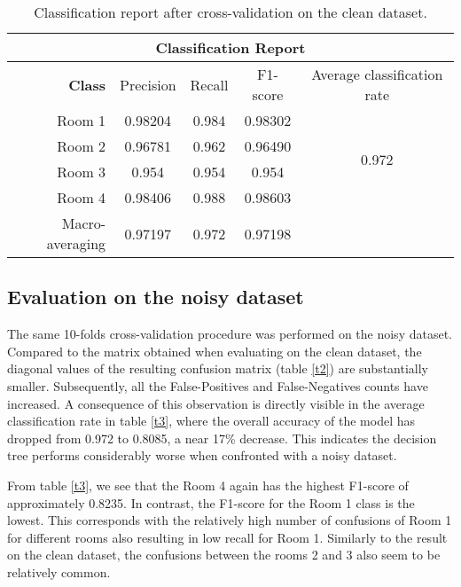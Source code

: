\documentclass[11pt, a4paper]{article}
\begin{document}
\begin{table}[H]
  \centering
  \setlength{\tabcolsep}{0.25cm}
  \renewcommand{\arraystretch}{1.25}
  \begin{tabular}{|r|c|c|c|c|}
  \hline
  \multicolumn{5}{|c|}{\textbf{Classification Report}}\\
  \hline
  \textbf{Class} & Precision & Recall & F1-score & Average classification rate \\
  \hline
  Room 1 & 0.98204 & 0.984 & 0.98302 & \multirow{4}{*}{0.972}\\ \cline{1-4}
  Room 2 & 0.96781 & 0.962 & 0.96490 &  \\ \cline{1-4}
  Room 3 & 0.954 & 0.954 & 0.954 &  \\ \cline{1-4}
  Room 4 & 0.98406 & 0.988 & 0.98603 &    \\ \cline{1-4}
  Macro-averaging & 0.97197 & 0.972 & 0.97198 &  \\ \hline
  \end{tabular}
  \caption{Classification report after cross-validation on the clean dataset.}
  \label{t1}
\end{table}


\subsection{Evaluation on the noisy dataset}
The same 10-folds cross-validation procedure was performed on the noisy dataset. Compared to the matrix obtained when evaluating on the clean dataset, the diagonal values of the resulting confusion matrix (table \ref{t2}) are substantially smaller. Subsequently, all the False-Positives and False-Negatives counts have increased. A consequence of this observation is directly visible in the average classification rate in table \ref{t3}, where the overall accuracy of the model has dropped from 0.972 to 0.8085, a near 17\% decrease. This indicates the decision tree performs considerably worse when confronted with a noisy dataset.

\medskip
From table \ref{t3}, we see that the Room 4 again has the highest F1-score of approximately 0.8235. In contrast, the F1-score for the Room 1 class is the lowest. This corresponds with the relatively high number of confusions of Room 1 for different rooms also resulting in low recall for Room 1. Similarly to the result on the clean dataset, the confusions between the rooms 2 and 3 also seem to be relatively common.
\end{document}

